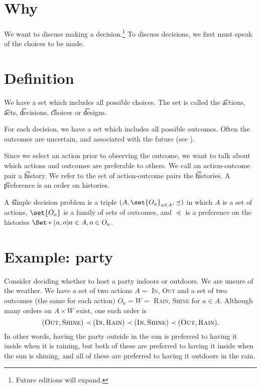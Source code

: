 

\section*{Why}

We want to discuss making a decision.\footnote{Future editions will expand.}
To discuss decisions, we first must speak of the choices to be made.

\section*{Definition}

We have a set which includes all possible choices.
The set is called the \t{actions}, \t{acts}, \t{decisions}, \t{choices} or \t{designs}.

For each decision, we have a set which includes all possible outcomes.
Often the outcomes are uncertain, and associated with the future (see ).

Since we select an action prior to observing the outcome, we want to talk about which actions and outcomes are preferable to others.
We call an action-outcome pair a \t{history}.
We refer to the set of action-outcome pairs the \t{histories}.
A \t{preference} is an order on histories.

A \t{simple decision problem} is a triple $(A, \set{O_a}_{a \in A}, \preceq)$ in which $A$ is a set of actions, $\set{O_a}$ is a family of sets of outcomes, and $\preceq$ is a preference on the histories $\Set*{(a, o)}{a \in A, o \in O_a}$.

\section*{Example: party}

Consider deciding whether to host a party indoors or outdoors.
We are unsure of the weather.
We have a set of two actions $A = $ {\textsc{In}, \textsc{Out}} and a set of two outcomes (the same for each action) $O_a = W =$ {\textsc{Rain}, \textsc{Shine}} for $a \in A$.
Although many orders on $A \times  W$ exist, one such order is
    \[
(\textsc{Out}, \textsc{Shine}) \prec (\textsc{In}, \textsc{Rain}) \prec (\textsc{In}, \textsc{Shine}) \prec (\textsc{Out}, \textsc{Rain}).
    \]
In other words, having the party outside in the sun is preferred to having it inside when it is raining, but both of these are preferred to having it inside when the sun is shining, and all of these are preferred to having it outdoors in the rain.

